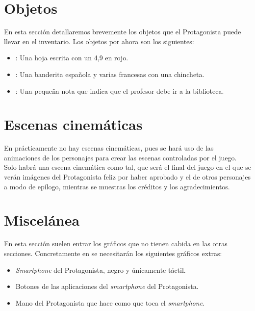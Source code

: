     \section{Objetos}
    En esta sección detallaremos brevemente los objetos que el Protagonista puede llevar en el inventario. Los objetos por ahora son los siguientes:
    \begin{itemize}
    \item {}: Una hoja escrita con un 4,9 en rojo.
    \item {}: Una banderita española y varias francesas con una chincheta.
    \item {}: Una pequeña nota que indica que el profesor debe ir a la biblioteca.
    \end{itemize}
    
    \section{Escenas cinemáticas}
    En \nombrejuego prácticamente no hay escenas cinemáticas, pues se hará uso de las animaciones de los personajes para crear las escenas controladas por el juego. Solo habrá una escena cinemática como tal, que será el final del juego en el que se verán imágenes del Protagonista feliz por haber aprobado y el de otros personajes a modo de epílogo, mientras se muestras los créditos y los agradecimientos.
    
    \section{Miscelánea}
    En esta sección suelen entrar los gráficos que no tienen cabida en las otras secciones. Concretamente en \nombrejuego se necesitarán los siguientes gráficos extras:
    \begin{itemize}
    \item \emph{Smartphone} del Protagonista, negro y únicamente táctil.
    \item Botones de las aplicaciones del \emph{smartphone} del Protagonista.
    \item Mano del Protagonista que hace como que toca el \emph{smartphone}.
    \end{itemize}